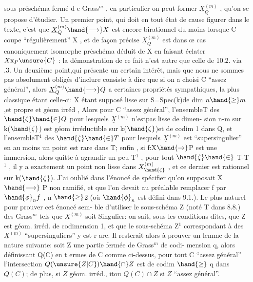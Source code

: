 
sous-préschéma fermé d e Grass$^{m}$ , en particulier on peut former $\underline{X}^{(m)}_{Q}$ ,
qu'on se propose d'étudier. Un premier point, qui doit en tout état de
cause figurer dans le texte, c'est que $\underline{X}^{(m)}_{Q} \hand{\longrightarrow} X$ est encore birationnel
du moins lorsque C coupe ``régulièrement'' X , et de façon précise $\underline{X}^{(m)}_{Q}$
est dans œ cas canoniquement isomorphe  préschéma déduit de X en
faisant éclater $X\mathrm{x}_{P}\unsure{C}$ : la démonstration de ce fait n'est autre que celle
de 10.2. via .3. Un deuxième point,qui présente un certain intérêt,
mais que nous ne sommes pas absolument obligés d'inclure consiste à
dire que si on a choisi C ``assez général'', alors $\underline{X}^{(m)}_{Q} \hand{\longrightarrow} Q$ a certaines
propriétés sympathiques, la plus classique étant celle-ci: X étant
supposé lisse sur S=Spec(k)de dim $n \hand{\geq} m$,et propre et géom irréd , Alors pour C ``assez
général'', l'ensembleT des $\hand{\zeta}\hand{\in} Q$ pour lesquels $\underline{X}^{(m)}$ n'estpas lisse de dimen-%
sion n-m sur k($\hand{\zeta}$) est géom irréductible sur k($\hand{\zeta}$)et de codim 1 dans Q, et 
l'ensembleT$^{1}$ des $\hand{\zeta}\hand{\in} T$ pour lesquels $\underline{X}^{(m)}$ est ``supersingulier'' en au
moins un point est rare dans T;
 enfin , si f:X$\hand{\rightarrow}$P est une immersion, alors
quitte à agrandir un peu T$^{1}$ , pour tout $\hand{\zeta}\hand{\in}$ T-T$^{1}$ , il y a exactement un
\placedmargin{$|$}point non lisse dans $X^{(m)}_{\hand{\zeta}}$ , et ce dernier est rationnel sur k($\hand{\zeta}$). J'ai
oublié dans l'énoncé de spécifier qu'on supposait X  $\hand{\longrightarrow}$ P non ramifié,
et que l'on devait au préalable remplacer f par $\hand{\phi}_{n}f$ , n $\hand{\geq}$2 (où $\hand{\phi}_{n}$ est
défini dans 9.1.). Le plus naturel  pour prouver cet énoncé sem-%
ble d'utiliser le sous-schéma Z (noté T dans 8.8.) des Grass$^{m}$ tels
que $\underline{X}^{(m)}$ soit Singulier: on sait, sous les conditions dites, que Z
est géom. irréd. de codimension 1, et que le sous-schéma Z$^{1}$ correspondant
à des $\underline{X}^{(m)}$ ``supersinguliers'' y est r are. Il resterait alors à prouver un
lemme de la nature suivante: soit Z une partie fermée de Grass$^{m}$ de codi-%
mension q, alors définissant Q(C) en t ermes de C comme ci-dessus, pour
tout C ``assez général'' l'intersection $Q(\unsure{Z|C})\hand{\cap} Z$ est de codim $\hand{\geq}$ q dans
$Q(C)$; de plus, si $Z$ géom. irréd., itou $Q(C)\cap Z$ si $Z$ ``assez général''.

